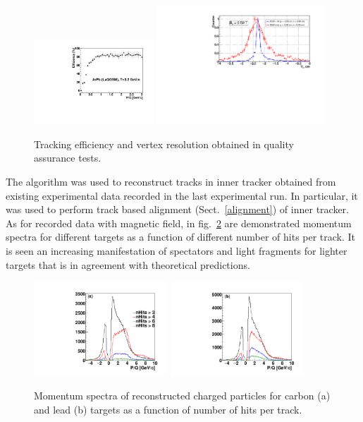 \documentclass{webofc}
\begin{document}
\begin{figure}[h]
  \centering
   \includegraphics[width=4.5cm,clip]{fig4b.pdf}
  \includegraphics[width=6.3cm,clip]{fig4a.pdf}
  \caption{Tracking efficiency and vertex resolution obtained in quality assurance tests.}
  \label{QA}       %
\end{figure}

The algorithm was used to reconstruct tracks in inner tracker obtained from existing experimental data recorded in the last experimental run.
In particular, it was used to perform track based alignment (Sect.~\ref{alignment}) of inner tracker.
As for recorded data with magnetic field, in fig.~\ref{spectra} are demonstrated momentum spectra for different targets as a function of different number of hits per track.
It is seen an increasing manifestation of spectators and light fragments for lighter targets that is in agreement with theoretical predictions.

\begin{figure}[h]
  \centering
  \includegraphics[width=5cm,clip]{fig5a.pdf}
  \includegraphics[width=5cm,clip]{fig5b.pdf}
  \caption{Momentum spectra of reconstructed charged particles for carbon (a) and lead (b) targets as a function of number of hits per track.}
  \label{spectra}       %
\end{figure}
\end{document}
